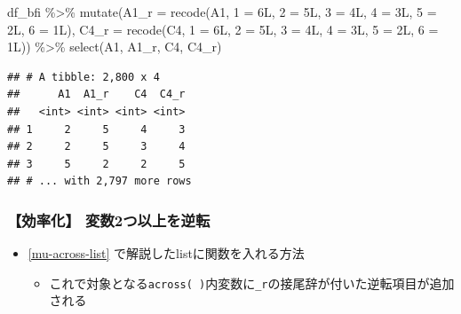 \documentclass[
  xelatex,ja=standard, b5paper]{bxjsbook}
\newenvironment{Shaded}{\begin{snugshade}}{\end{snugshade}}
\newcommand{\AttributeTok}[1]{\textcolor[rgb]{0.77,0.63,0.00}{#1}}
\newcommand{\FunctionTok}[1]{\textcolor[rgb]{0.00,0.00,0.00}{#1}}
\newcommand{\NormalTok}[1]{#1}
\newcommand{\OtherTok}[1]{\textcolor[rgb]{0.56,0.35,0.01}{#1}}
\newcommand{\SpecialCharTok}[1]{\textcolor[rgb]{0.00,0.00,0.00}{#1}}
\newcommand{\StringTok}[1]{\textcolor[rgb]{0.31,0.60,0.02}{#1}}
\providecommand{\tightlist}{%
  \setlength{\itemsep}{0pt}\setlength{\parskip}{0pt}}
\begin{document}
\begin{Shaded}
\begin{Highlighting}[]
\NormalTok{df\_bfi }\SpecialCharTok{\%\textgreater{}\%} 
  \FunctionTok{mutate}\NormalTok{(}\AttributeTok{A1\_r =} \FunctionTok{recode}\NormalTok{(A1, }\StringTok{\textasciigrave{}}\AttributeTok{1}\StringTok{\textasciigrave{}} \OtherTok{=}\NormalTok{ 6L, }\StringTok{\textasciigrave{}}\AttributeTok{2}\StringTok{\textasciigrave{}} \OtherTok{=}\NormalTok{ 5L, }\StringTok{\textasciigrave{}}\AttributeTok{3}\StringTok{\textasciigrave{}} \OtherTok{=}\NormalTok{ 4L, }
                           \StringTok{\textasciigrave{}}\AttributeTok{4}\StringTok{\textasciigrave{}} \OtherTok{=}\NormalTok{ 3L, }\StringTok{\textasciigrave{}}\AttributeTok{5}\StringTok{\textasciigrave{}} \OtherTok{=}\NormalTok{ 2L, }\StringTok{\textasciigrave{}}\AttributeTok{6}\StringTok{\textasciigrave{}} \OtherTok{=}\NormalTok{ 1L),}
         \AttributeTok{C4\_r =} \FunctionTok{recode}\NormalTok{(C4, }\StringTok{\textasciigrave{}}\AttributeTok{1}\StringTok{\textasciigrave{}} \OtherTok{=}\NormalTok{ 6L, }\StringTok{\textasciigrave{}}\AttributeTok{2}\StringTok{\textasciigrave{}} \OtherTok{=}\NormalTok{ 5L, }\StringTok{\textasciigrave{}}\AttributeTok{3}\StringTok{\textasciigrave{}} \OtherTok{=}\NormalTok{ 4L, }
                           \StringTok{\textasciigrave{}}\AttributeTok{4}\StringTok{\textasciigrave{}} \OtherTok{=}\NormalTok{ 3L, }\StringTok{\textasciigrave{}}\AttributeTok{5}\StringTok{\textasciigrave{}} \OtherTok{=}\NormalTok{ 2L, }\StringTok{\textasciigrave{}}\AttributeTok{6}\StringTok{\textasciigrave{}} \OtherTok{=}\NormalTok{ 1L)) }\SpecialCharTok{\%\textgreater{}\%} 
  \FunctionTok{select}\NormalTok{(A1, A1\_r, C4, C4\_r)}
\end{Highlighting}
\end{Shaded}

\begin{verbatim}
## # A tibble: 2,800 x 4
##      A1  A1_r    C4  C4_r
##   <int> <int> <int> <int>
## 1     2     5     4     3
## 2     2     5     3     4
## 3     5     2     2     5
## # ... with 2,797 more rows
\end{verbatim}

\hypertarget{mu-rev-recode2ef}{%
\subsubsection{【効率化】 変数2つ以上を逆転}\label{mu-rev-recode2ef}}

\begin{itemize}
\tightlist
\item
  \ref{mu-across-list} で解説したlistに関数を入れる方法

  \begin{itemize}
  \tightlist
  \item
    これで対象となる\texttt{across(\ )}内変数に\texttt{\_r}の接尾辞が付いた逆転項目が追加される
  \end{itemize}
\end{itemize}
\end{document}
